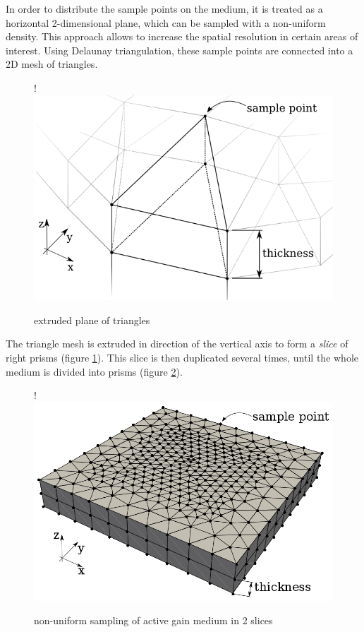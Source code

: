 In order to distribute the sample points on the medium, it is treated as
a horizontal 2-dimensional plane, which can be sampled with a non-uniform
density. This approach allows to increase the spatial resolution in certain
areas of interest. Using Delaunay triangulation, these sample points are
connected into a 2D mesh of triangles.

\begin{figure}[H]
  \centerline{
     {!} {\includegraphics{graphics/delauny_3.png}}
  }
  \caption{extruded plane of triangles}
  \label{graphic:extruded_mesh}
\end{figure}

The triangle mesh is extruded in direction of the vertical axis to form a
\emph{slice} of right prisms (figure \ref{graphic:extruded_mesh}). This
slice is then duplicated several times, until the whole medium is divided into
prisms (figure \ref{graphic:samples_reduced}).

\begin{figure}[H]
  \centerline{
     {!} {\includegraphics{graphics/samples_reduced.png}}
  }
  \caption{non-uniform sampling of active gain medium in 2 slices}
  \label{graphic:samples_reduced}
\end{figure}




